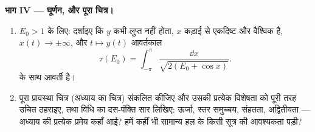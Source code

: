 \begin{problem}
\medskip
\noindent\textbf{भाग IV --- घूर्णन, और पूरा चित्र।}
\begin{enumerate}[resume]
  \item $E_0 > 1$ के लिए: दर्शाइए कि $y$ कभी लुप्त नहीं होता,
        $x$ कड़ाई से एकदिष्ट और वैश्विक है, $x(t) \to
        \pm\infty$, और $t \mapsto y(t)$
        आवर्तकाल
        \[
        \tau(E_0) = \int_{-\pi}^{\pi}
        \frac{\dd x}{\sqrt{2(E_0 + \cos x)}} .
        \]
        के साथ आवर्ती है।
  \item पूरा प्रावस्था चित्र (अध्याय का चित्र) संकलित कीजिए और
        उसकी प्रत्येक विशेषता को पूरी तरह उचित ठहराइए, तथा विधि
        का दस-पंक्ति सार लिखिए: ऊर्जा, स्तर समुच्चय, संहतता,
        अद्वितीयता --- अध्याय की प्रत्येक प्रमेय कहाँ आई? हमें
        कहीं भी सामान्य हल के किसी सूत्र की आवश्यकता पड़ी?
\end{enumerate}


\end{problem}
